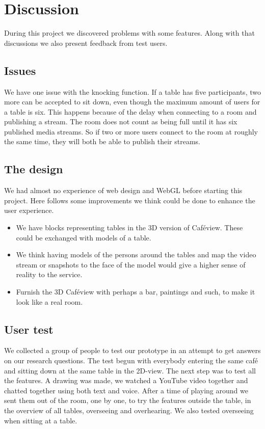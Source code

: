 \documentclass[12pt, titlepage]{article}
\begin{document}
\section{Discussion}
During this project we discovered problems with some features. Along with that discussions we also present feedback from test users.
\subsection{Issues}
We have one issue with the knocking function. If a table has five participants, two more can be accepted to sit down, even though the maximum amount of users for a table is six. This happens because of the delay when connecting to a room and publishing a stream. The room does not count as being full until it has six published media streams. So if two or more users connect to the room at roughly the same time, they will both be able to publish their streams.
\subsection{The design}
We had almost no experience of web design and WebGL before starting this project. Here follows some improvements we think could be done to enhance the user experience.
\begin{itemize}
\item We have blocks representing tables in the 3D version of Caféview. These could be exchanged with models of a table. 
\item We think having models of the persons around the tables and map the video stream or snapshots to the face of the model would give a higher sense of reality to the service.
\item Furnish the 3D Caféview with perhaps a bar, paintings and such, to make it look like a real room.
\end{itemize}
\subsection{User test}
We collected a group of people to test our prototype in an attempt to get answers on our research questions. The test begun with everybody entering the same café and sitting down at the same table in the 2D-view. The next step was to test all the features. A drawing was made, we watched a YouTube video together and chatted together using both text and voice. After a time of playing around we sent them out of the room, one by one, to try the features outside the table, in the overview of all tables, overseeing and overhearing. We also tested overseeing when sitting at a table.
\end{document}
